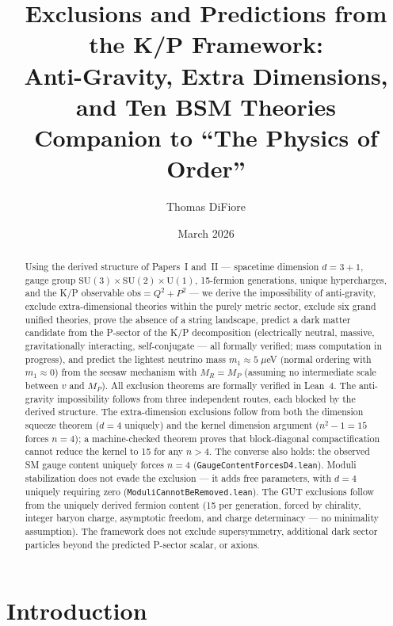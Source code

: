 \documentclass[11pt,letterpaper]{article}
\title{Exclusions and Predictions from the K/P Framework:\\
  Anti-Gravity, Extra Dimensions, and Ten BSM Theories\\[6pt]
  \large Companion to ``The Physics of Order''}
\author{Thomas DiFiore}
\date{March 2026}
\begin{document}
\maketitle

\begin{abstract}
Using the derived structure of Papers~I and~II --- spacetime dimension
$d = 3+1$, gauge group $\mathrm{SU}(3) \times \mathrm{SU}(2) \times
\mathrm{U}(1)$, 15-fermion generations, unique hypercharges, and the
K/P observable $\mathrm{obs} = Q^2 + P^2$ --- we derive the
impossibility of anti-gravity, exclude extra-dimensional theories
within the purely metric sector,
exclude six grand unified theories, prove the absence of a string
landscape, predict a dark matter candidate from the P-sector of
the K/P decomposition (electrically neutral, massive, gravitationally
interacting, self-conjugate --- all formally verified; mass
computation in progress), and predict
the lightest neutrino mass $m_1 \approx 5\;\mu$eV
(normal ordering with $m_1 \approx 0$)
from the seesaw mechanism with $M_R = M_P$ (assuming no intermediate
scale between $v$ and $M_P$).
All exclusion theorems are formally verified in Lean~4.
The anti-gravity impossibility follows from three independent routes,
each blocked by the derived structure. The extra-dimension exclusions
follow from both the dimension squeeze theorem ($d = 4$ uniquely)
and the kernel dimension argument ($n^2 - 1 = 15$ forces $n = 4$);
a machine-checked theorem proves that block-diagonal
compactification cannot reduce the kernel to 15 for any $n > 4$.
The converse also holds: the observed SM gauge content uniquely
forces $n = 4$ (\texttt{GaugeContentForcesD4.lean}).
Moduli stabilization does not evade the exclusion --- it adds free
parameters, with $d = 4$ uniquely requiring zero
(\texttt{ModuliCannotBeRemoved.lean}). The GUT
exclusions follow from the uniquely derived fermion content (15 per
generation, forced by chirality, integer baryon charge, asymptotic
freedom, and charge determinacy --- no minimality assumption).
The framework does not
exclude supersymmetry, additional dark sector particles beyond the
predicted P-sector scalar, or axions.
\end{abstract}

\section{Introduction}
\end{document}
